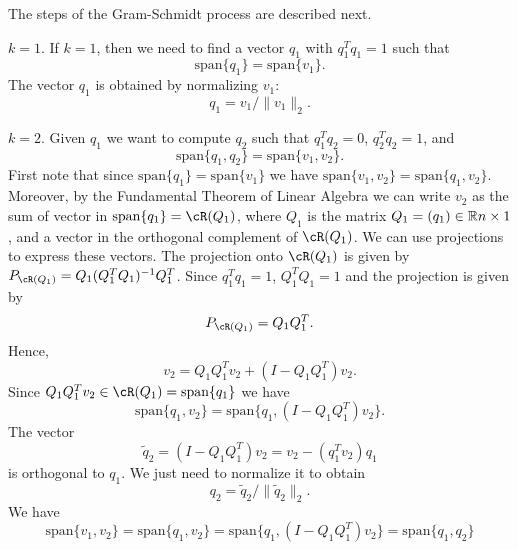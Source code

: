 \documentclass{article}
\providecommand{\real}[1]{\mathbb{R}}
\begin{document}
The steps of the Gram-Schmidt process are described next.
\begin{list}{}{}
\item[$k=1$.]
If $k=1$, then we need to find a vector $q_1$ with $q_1^Tq_1=1$ such that
\[
         \mbox{span} \{ q_1 \} = \mbox{span} \{ v_1 \}.
\]
The vector $q_1$ is obtained by normalizing $v_1$:
\[
        q_1 = v_1 / \|v_1\|_2.
\]

\item[$k=2$.]
Given $q_1$ we want to compute $q_2$ such that $q_1^Tq_2 = 0$, $q_2^Tq_2=1$, and
\[
         \mbox{span} \{ q_1, q_2 \} = \mbox{span} \{ v_1, v_2 \}.
\]
First note that 
since $\mbox{span} \{ q_1 \} = \mbox{span} \{ v_1 \}$ we have $\mbox{span} \{ v_1, v_2 \} = \mbox{span} \{ q_1, v_2 \}$.
Moreover, by the Fundamental Theorem of Linear Algebra we can write $v_2$ as the sum of  vector
in $\mbox{span} \{ q_1 \}  = \cR(Q_1)$, where $Q_1$ is the matrix $Q_1 = (q_1) \in \real^{n\times 1}$, 
and a vector in the orthogonal complement of $\cR(Q_1)$.
We can use projections to express these vectors. The projection onto  $\cR(Q_1)$ is given by
$P_{\cR(Q_1)}= Q_1 (Q_1^TQ_1)^{-1} Q_1^T$. Since $q_1^Tq_1=1$, $Q_1^TQ_1 =1$ and the projection is
given by
\[
         P_{\cR(Q_1)}= Q_1Q_1^T.
\]
Hence,
\[
     v_2 =  Q_1Q_1^T v_2 + (I-Q_1Q_1^T) v_2.
\]
Since $Q_1Q_1^T v_2 \in \cR(Q_1) = \mbox{span} \{ q_1 \}$ we have
\[
       \mbox{span} \{ q_1, v_2 \} =   \mbox{span} \{ q_1, (I-Q_1Q_1^T) v_2 \}.
\]
The vector 
\[
       \widetilde{q}_2 = (I-Q_1Q_1^T) v_2 = v_2 - (q_1^Tv_2) q_1
\]
is orthogonal to $q_1$. We just need to normalize it to obtain 
\[
       q_2 =   \widetilde{q}_2 / \| \widetilde{q}_2 \|_2.
\]
We have
\[
      \mbox{span} \{ v_1, v_2 \} = \mbox{span} \{ q_1, v_2 \} = \mbox{span} \{ q_1, (I-Q_1Q_1^T) v_2 \}
      =   \mbox{span} \{ q_1, q_2 \}
\]


\end{list}
\end{document}
